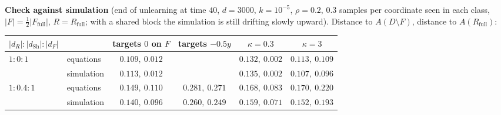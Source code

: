 \documentclass[10pt]{article}
\newcommand{\Rf}{R_{\mathrm{full}}}\newcommand{\Ff}{F_{\mathrm{full}}}\newcommand{\dSh}{d_{\mathrm{Sh}}}
\begin{document}
\textbf{Check against simulation} (end of unlearning at time $40$, $d=3000$, $k=10^{-5}$, $\rho=0.2$, $0.3$ samples per coordinate seen in each class, $|F|=\frac12|\Ff|$, $R=\Rf$; with a shared block the simulation is still drifting slowly upward). Distance to $A(D\setminus F)$, distance to $A(\Rf)$:
\begin{center}\small\begin{tabular}{@{}llcccc@{}}\toprule
$|d_R|:|\dSh|:|d_F|$ & & targets $0$ on $F$ & targets $-0.5y$ & $\kappa=0.3$ & $\kappa=3$\\\midrule
$1:0:1$ & equations & $0.109,\ 0.012$ & & $0.132,\ 0.002$ & $0.113,\ 0.109$\\
& simulation & $0.113,\ 0.012$ & & $0.135,\ 0.002$ & $0.107,\ 0.096$\\
$1:0.4:1$ & equations & $0.149,\ 0.110$ & $0.281,\ 0.271$ & $0.168,\ 0.083$ & $0.170,\ 0.220$\\
& simulation & $0.140,\ 0.096$ & $0.260,\ 0.249$ & $0.159,\ 0.071$ & $0.152,\ 0.193$\\\bottomrule
\end{tabular}\end{center}
\end{document}
